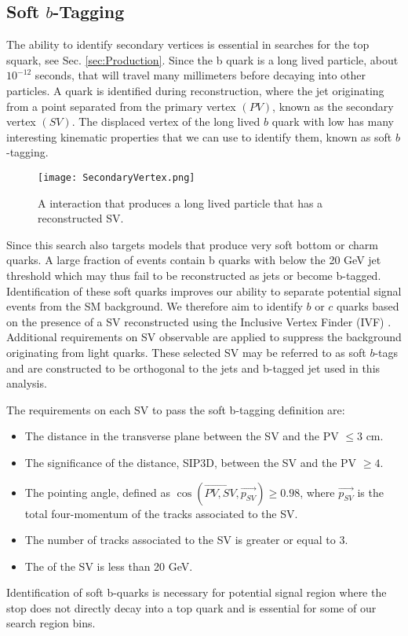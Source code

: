 \subsection{Soft $b$-Tagging}\label{SV}

The ability to identify secondary vertices is essential in searches for the top squark, see Sec. \ref{sec:Production}. Since the b quark is a long lived particle, about $10^{-12}$ seconds, that will travel many millimeters before decaying into other particles. A \B{} quark is identified during reconstruction, where the jet originating from a point separated from the primary vertex $(PV)$, known as the secondary vertex $(SV)$. The displaced vertex of the long lived $b$ quark with low \pt{} has many interesting kinematic properties that we can use to identify them, known as soft $b$-tagging. 

\begin{figure}
 	\centering
	\texttt{[image: SecondaryVertex.png]}
 	\caption[Secondary Vertex Diagram]{A interaction that produces a long lived particle that has a reconstructed SV.}
 	\label{SecondaryVertex} 
\end{figure}

Since this search also targets models that produce very soft bottom or charm quarks. A large fraction of events contain b quarks with \pt{} below the 20 GeV jet threshold which may thus fail to be reconstructed as jets or become b-tagged. Identification of these soft quarks improves our ability to separate potential signal events from the SM background. We therefore aim to identify $b$ or $c$ quarks based on the presence of a SV reconstructed using the Inclusive Vertex Finder (IVF) \cite{noauthor_inclusivesecondaryvertexfinder_nodate}. Additional requirements on SV observable are applied to suppress the background originating from light quarks. These selected SV may be referred to as soft $b$-tags and are constructed to be orthogonal to the jets and b-tagged jet used in this analysis. 

The requirements on each SV to pass the soft b-tagging definition are:
\begin{itemize}
	 \item The distance in the transverse plane between the SV and the PV $\leq3$ cm.
	 \item The significance of the distance, SIP3D, between the SV and the PV $\geq4$.
	 \item The pointing angle, defined as $\cos(\overrightarrow{PV,SV},\overrightarrow{p_{SV}})\geq0.98$, where $\overrightarrow{p_{SV}}$ is the total four-momentum of the tracks associated to the SV. 
	 \item The number of tracks associated to the SV is greater or equal to 3.
	 \item The \pt{} of the SV is less than 20 GeV.
\end{itemize}
Identification of soft b-quarks is necessary for potential signal region where the stop does not directly decay into a top quark and is essential for some of our search region bins. 


